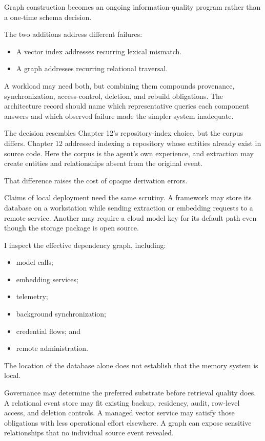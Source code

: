 Graph construction becomes an ongoing information-quality program rather than a one-time schema decision.

The two additions address different failures:

\begin{itemize}
\tightlist
\item
  A vector index addresses recurring lexical mismatch.
\item
  A graph addresses recurring relational traversal.
\end{itemize}

A workload may need both, but combining them compounds provenance, synchronization, access-control, deletion, and rebuild obligations. The architecture record should name which representative queries each component answers and which observed failure made the simpler system inadequate.

The decision resembles Chapter 12's repository-index choice, but the corpus differs. Chapter 12 addressed indexing a repository whose entities already exist in source code. Here the corpus is the agent's own experience, and extraction may create entities and relationships absent from the original event.

That difference raises the cost of opaque derivation errors.

Claims of local deployment need the same scrutiny. A framework may store its database on a workstation while sending extraction or embedding requests to a remote service. Another may require a cloud model key for its default path even though the storage package is open source.

I inspect the effective dependency graph, including:

\begin{itemize}
\tightlist
\item
  model calls;
\item
  embedding services;
\item
  telemetry;
\item
  background synchronization;
\item
  credential flows; and
\item
  remote administration.
\end{itemize}

The location of the database alone does not establish that the memory system is local.

Governance may determine the preferred substrate before retrieval quality does. A relational event store may fit existing backup, residency, audit, row-level access, and deletion controls. A managed vector service may satisfy those obligations with less operational effort elsewhere. A graph can expose sensitive relationships that no individual source event revealed.

